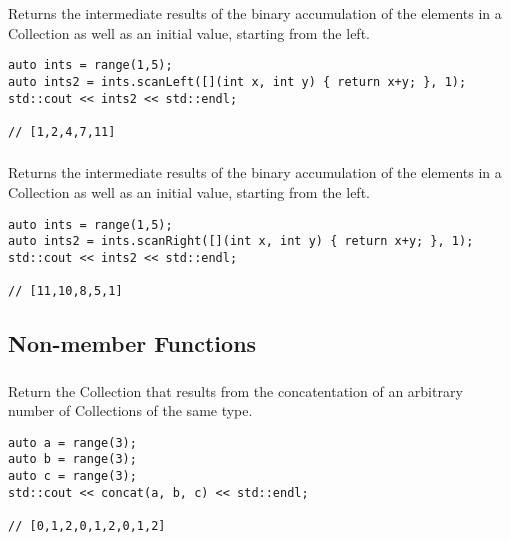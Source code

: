 Returns the intermediate results of the binary accumulation of the elements in a Collection as well as an initial value, starting from the left.

\begin{lstlisting}[title=example]
auto ints = range(1,5);
auto ints2 = ints.scanLeft([](int x, int y) { return x+y; }, 1);
std::cout << ints2 << std::endl;

// [1,2,4,7,11]
\end{lstlisting}




\subsubsection{}

Returns the intermediate results of the binary accumulation of the elements in a Collection as well as an initial value, starting from the left.

\begin{lstlisting}[title=example]
auto ints = range(1,5);
auto ints2 = ints.scanRight([](int x, int y) { return x+y; }, 1);
std::cout << ints2 << std::endl;

// [11,10,8,5,1]
\end{lstlisting}




\subsection{Non-member Functions}

\subsubsection{}

Return the Collection that results from the concatentation of an arbitrary number of Collections of the same type.

\begin{lstlisting}[title=example]
auto a = range(3);
auto b = range(3);
auto c = range(3);
std::cout << concat(a, b, c) << std::endl;

// [0,1,2,0,1,2,0,1,2]
\end{lstlisting}





\subsubsection{}

